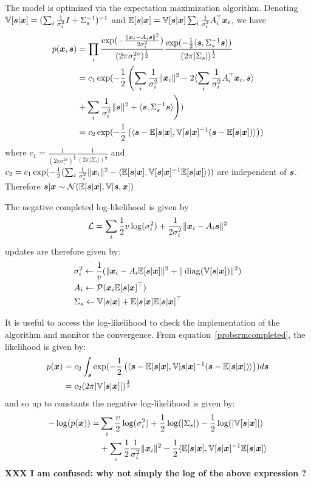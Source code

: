 The model is optimized via the expectation maximization algorithm.
Denoting $\mathbb{V}[\boldsymbol{s} | \boldsymbol{x}] = (\sum_i \frac1{\sigma_i^2} I +
\Sigma_s^{-1})^{-1}$ and $\mathbb{E}[\boldsymbol{s} | \boldsymbol{x}] = \mathbb{V}[\boldsymbol{s} | \boldsymbol{x}] \sum_i \frac1{\sigma_i^2}
A_i^{\top}\boldsymbol{x}_i$, we have
\begin{align}
  p(\boldsymbol{x}, \boldsymbol{s}) &= \prod_i \frac{\exp(-\frac{\|\boldsymbol{x}_i - A_i \boldsymbol{s} \|^2}{2 \sigma_i^2})}{(2 \pi \sigma_i^{2v})^{\frac12}} \frac{\exp(-\frac12 \langle \boldsymbol{s} , \Sigma_s^{-1} \boldsymbol{s} \rangle )}{(2 \pi | \Sigma_s|)^{\frac12}} \\
               &= c_1 \exp(-\frac12 \left( \sum_i \frac1{\sigma_i^2}\|\boldsymbol{x}_i\|^2 - 2  \langle \sum_i \frac1{\sigma_i^2} A_i^{\top}\boldsymbol{x}_i, \boldsymbol{s} \rangle \right. \\& \left.+ \sum_i \frac1{\sigma_i^2} \| \boldsymbol{s} \|^2 + \langle \boldsymbol{s}, \Sigma_s^{-1} \boldsymbol{s} \rangle  \right)) \\
               &= c_2 \exp(-\frac12 \left( \langle  \boldsymbol{s} - \mathbb{E}[\boldsymbol{s} | \boldsymbol{x}], \mathbb{V}[\boldsymbol{s} | \boldsymbol{x}]^{-1} ( \boldsymbol{s} - \mathbb{E}[\boldsymbol{s} | \boldsymbol{x}])  \rangle \right)) \label{probsrmcompleted}
\end{align}
where $c_1 = \frac1{(2 \pi \sigma_i^{2v})^{\frac12}}\frac1{(2 \pi |
  \Sigma_s|)^{\frac12}}$ and $c_2 = c_1 \exp(-\frac12( \sum_i
\frac1{\sigma_i^2}\|\boldsymbol{x}_i\|^2 - \langle  \mathbb{E}[\boldsymbol{s} | \boldsymbol{x}], \mathbb{V}[\boldsymbol{s} | \boldsymbol{x}]^{-1} \mathbb{E}[\boldsymbol{s} | \boldsymbol{x}] \rangle))$ are independent of $\boldsymbol{s}$.
Therefore $\boldsymbol{s}| \boldsymbol{x} \sim \mathcal{N}(\mathbb{E}[\boldsymbol{s} | \boldsymbol{x}], \mathbb{V}[\boldsymbol{s}, \boldsymbol{x}])$

The negative completed log-likelihood is given by
\begin{align}
	\mathcal{L} = \sum_i \frac12 v \log(\sigma_i^2) + \frac1{2 \sigma_i^2} \| \boldsymbol{x}_i - A_i \boldsymbol{s} \|^2
\end{align}
updates are therefore given by:
\begin{align}
&\sigma_i^2 \leftarrow \frac1{v} (\| \boldsymbol{x}_i - A_i \mathbb{E}[\boldsymbol{s}|\boldsymbol{x}]\|^2 + \| \operatorname*{diag}(\mathbb{V}[\boldsymbol{s} | \boldsymbol{x}]) \|^2) \\
  &A_i \leftarrow \mathcal{P}(\boldsymbol{x}_i \mathbb{E}[\boldsymbol{s}|\boldsymbol{x}]^{\top}) \label{eq:psrm:Aiupdate} \\
  & \Sigma_s \leftarrow \mathbb{V}[\boldsymbol{s} | \boldsymbol{x}] + \mathbb{E}[\boldsymbol{s} | \boldsymbol{x}] \mathbb{E}[\boldsymbol{s} | \boldsymbol{x}]^{\top}
\end{align}

It is useful to access the log-likelihood to check the implementation of the
algorithm and monitor the convergence. From equation~\eqref{probsrmcompleted},
the likelihood is given by:
\begin{align}
  p(\boldsymbol{x}) &= c_2 \int_{\boldsymbol{s}} \exp(-\frac12 \left( \langle  \boldsymbol{s} - \mathbb{E}[\boldsymbol{s} | \boldsymbol{x}], \mathbb{V}[\boldsymbol{s} | \boldsymbol{x}]^{-1} ( \boldsymbol{s} - \mathbb{E}[\boldsymbol{s} | \boldsymbol{x}])  \rangle \right)) d\boldsymbol{s} \\
         &= c_2 (2 \pi |\mathbb{V}[\boldsymbol{s} | \boldsymbol{x}]|)^{\frac12}
\end{align}
and so up to constants the negative log-likelihood is given by:
\begin{align}
  -\log(p(\boldsymbol{x})) = &\sum_i \frac{v}{2} \log(\sigma_i^2) + \frac12 \log(|\Sigma_s|) - \frac12 \log(|\mathbb{V}[\boldsymbol{s} | \boldsymbol{x}]|) \\ &+ \sum_i
  \frac12 \frac1{\sigma_i^2}\|\boldsymbol{x}_i\|^2 - \frac12 \langle  \mathbb{E}[\boldsymbol{s} | \boldsymbol{x}], \mathbb{V}[\boldsymbol{s} | \boldsymbol{x}]^{-1} \mathbb{E}[\boldsymbol{s} | \boldsymbol{x}] \rangle
\end{align}
\textbf{XXX I am confused: why not simply the log of the above expression ?}


